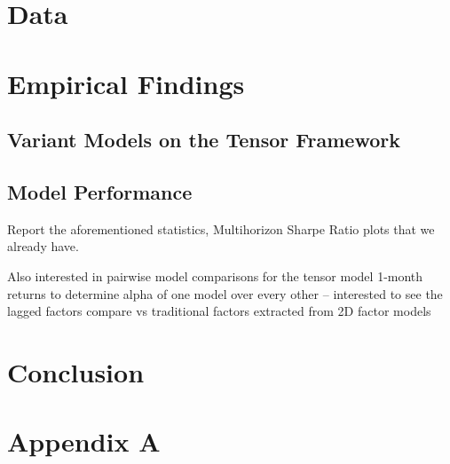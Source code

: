 \documentclass[12pt,letterpaper,fleqn]{article}
\begin{document}
\section{Data}

\section{Empirical Findings}

\subsection{Variant Models on the Tensor Framework}

\subsection{Model Performance}

Report the aforementioned statistics, Multihorizon Sharpe Ratio plots that we 
already have. 

Also interested in pairwise model comparisons for the tensor model 1-month returns to 
determine alpha of one model over every other -- interested to see the lagged factors 
compare vs traditional factors extracted from 2D factor models

\section{Conclusion}

\section{Appendix A}

\newpage

\clearpage


\end{document}
